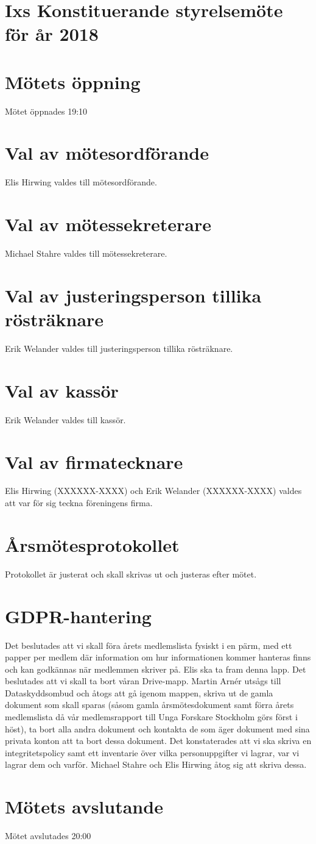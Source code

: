 \documentclass[a4paper,11pt,oneside]{article}
\begin{document}
\section*{Ixs Konstituerande styrelsemöte för år 2018}

\section*{Mötets öppning}
Mötet öppnades 19:10

\section*{Val av mötesordförande}
Elis Hirwing valdes till mötesordförande.

\section*{Val av mötessekreterare}
Michael Stahre valdes till mötessekreterare.

\section*{Val av justeringsperson tillika rösträknare}
Erik Welander valdes till justeringsperson tillika rösträknare.

\section*{Val av kassör}
Erik Welander valdes till kassör.

\section*{Val av firmatecknare}
Elis Hirwing (XXXXXX-XXXX) och Erik Welander (XXXXXX-XXXX) valdes att var för sig teckna föreningens firma.

\section*{Årsmötesprotokollet}
Protokollet är justerat och skall skrivas ut och justeras efter mötet.

\section*{GDPR-hantering}
Det beslutades att vi skall föra årets medlemslista fysiskt i en pärm, med ett papper per medlem där information om hur informationen kommer hanteras finns och kan godkännas när medlemmen skriver på. Elis ska ta fram denna lapp.
Det beslutades att vi skall ta bort våran Drive-mapp.
Martin Arnér utsågs till Dataskyddsombud och åtogs att gå igenom mappen, skriva ut de gamla dokument som skall sparas (såsom gamla årsmötesdokument samt förra årets medlemslista då vår medlemsrapport till Unga Forskare Stockholm görs först i höst), ta bort alla andra dokument och kontakta de som äger dokument med sina privata konton att ta bort dessa dokument.
Det konstaterades att vi ska skriva en integritetspolicy samt ett inventarie över vilka personuppgifter vi lagrar, var vi lagrar dem och varför. Michael Stahre och Elis Hirwing åtog sig att skriva dessa.

\section*{Mötets avslutande}
Mötet avslutades 20:00
\end{document}
